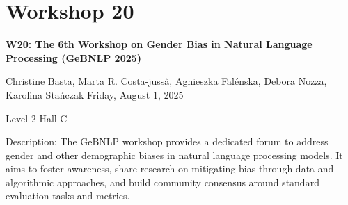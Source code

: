 \clearpage


\section[W20: The 6th Workshop on Gender Bias in Natural Language Processing (GeBNLP 2025)]{Workshop 20}

\begin{center}
    {\Large \textbf{W20: The 6th Workshop on Gender Bias in Natural Language Processing (GeBNLP 2025)}}

Christine Basta, Marta R. Costa-jussà, Agnieszka Falénska, Debora Nozza, Karolina Stańczak
    Friday, August 1, 2025
    
 Level 2 Hall C
\end{center}

Description: The GeBNLP workshop provides a dedicated forum to address gender and other demographic biases in natural language processing models. It aims to foster awareness, share research on mitigating bias through data and algorithmic approaches, and build community consensus around standard evaluation tasks and metrics.

